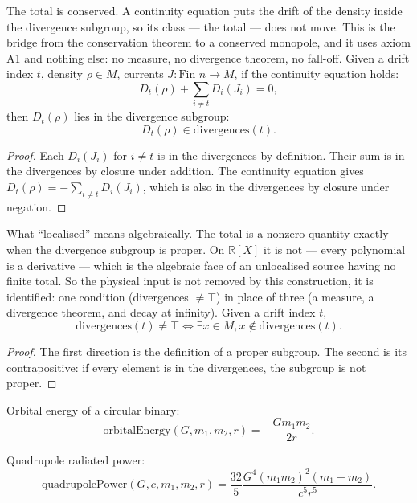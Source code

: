 \begin{theorem}
The total is conserved. A continuity equation puts the drift of the density inside the divergence subgroup, so its class — the total — does not move. This is the bridge from the conservation theorem to a conserved monopole, and it uses axiom A1 and nothing else: no measure, no divergence theorem, no fall-off. Given a drift index $t$, density $\rho \in M$, currents $J : \text{Fin } n \to M$, if the continuity equation holds:
\[
D_t(\rho) + \sum_{i \neq t} D_i(J_i) = 0,
\]
then $D_t(\rho)$ lies in the divergence subgroup:
\[
D_t(\rho) \in \text{divergences}(t).
\]
\begin{proof}
Each $D_i(J_i)$ for $i \neq t$ is in the divergences by definition. Their sum is in the divergences by closure under addition. The continuity equation gives $D_t(\rho) = -\sum_{i \neq t} D_i(J_i)$, which is also in the divergences by closure under negation.
\end{proof}
\end{theorem}

\begin{theorem}
What ``localised'' means algebraically. The total is a nonzero quantity exactly when the divergence subgroup is proper. On $\mathbb{R}[X]$ it is not — every polynomial is a derivative — which is the algebraic face of an unlocalised source having no finite total. So the physical input is not removed by this construction, it is identified: one condition (divergences $\neq \top$) in place of three (a measure, a divergence theorem, and decay at infinity). Given a drift index $t$,
\[
\text{divergences}(t) \neq \top \iff \exists x \in M, x \notin \text{divergences}(t).
\]
\begin{proof}
The first direction is the definition of a proper subgroup. The second is its contrapositive: if every element is in the divergences, the subgroup is not proper.
\end{proof}
\end{theorem}

\begin{definition}
Orbital energy of a circular binary:
\[
\text{orbitalEnergy}(G, m_1, m_2, r) = -\frac{Gm_1 m_2}{2r}.
\]
\end{definition}

\begin{definition}
Quadrupole radiated power:
\[
\text{quadrupolePower}(G, c, m_1, m_2, r) = \frac{32}{5} \frac{G^4(m_1 m_2)^2(m_1 + m_2)}{c^5 r^5}.
\]
\end{definition}

